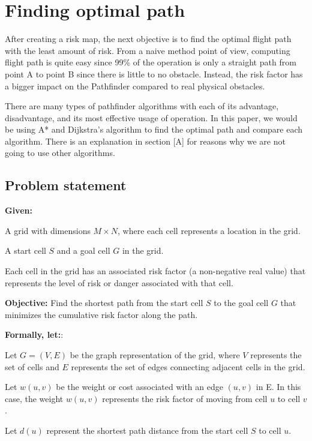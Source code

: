 \documentclass[12pt]{report}
\begin{document}
    \section{Finding optimal path}
        After creating a risk map, the next objective is to find the optimal flight path with the least amount of risk.
        From a naive method point of view, computing flight path is quite easy since 99\% of the operation is only a
        straight path from point A to point B since there is little to no obstacle. Instead, the risk factor has a
        bigger impact on the Pathfinder compared to real physical obstacles.

        There are many types of pathfinder algorithms with each of its advantage, disadvantage, and its most effective
        usage of operation. In this paper, we would be using A* and Dijkstra's algorithm to find the optimal path and
        compare each algorithm. There is an explanation in section [A] for reasons why we are not going to use other
        algorithms.

        \subsection{Problem statement}
        \textbf{Given:}
        \begin{myitemize}
            \item A grid with dimensions \(M \times N\), where each cell represents a location in the grid.
            \item A start cell \(S\) and a goal cell \(G\) in the grid. 
            \item Each cell in the grid has an associated risk factor (a non-negative real value) that represents the
            level of risk or danger associated with that cell.
        \end{myitemize}

        \textbf{Objective:} Find the shortest path from the start cell \(S\) to the goal cell \(G\) that minimizes the
        cumulative risk factor along the path.
        
        \textbf{Formally, let:}:
        \begin{myitemize}
            \item Let \(G = (V, E)\)  be the graph representation of the grid, where \(V\) represents the set of cells
            and \(E\) represents the set of edges connecting adjacent cells in the grid.
            \item Let \(w(u, v)\) be the weight or cost associated with an edge \((u, v)\) in E. In this case, the
            weight \(w(u, v)\)  represents the risk factor of moving from cell \(u\) to cell \(v\).
            \item Let \(d(u)\) represent the shortest path distance from the start cell \(S\) to cell \(u\).
        \end{myitemize}
\end{document}
